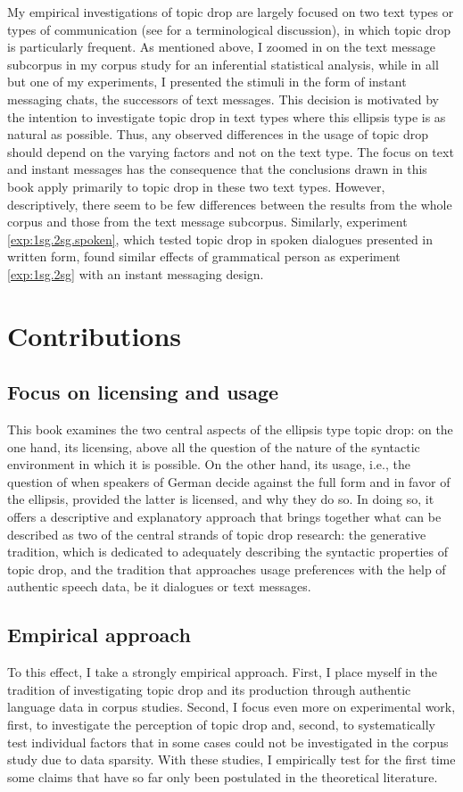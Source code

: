 My empirical investigations of topic drop are largely focused on two text types or types of communication (see  for a terminological discussion), in which topic drop is particularly frequent.
As mentioned above, I zoomed in on the text message subcorpus in my corpus study  for an inferential statistical analysis, while in all but one of my experiments, I presented the stimuli in the form of instant messaging chats, the successors of text messages.
This decision is motivated by the intention to investigate topic drop in text types where this ellipsis type is as natural as possible.
Thus, any observed differences in the usage of topic drop should depend on the varying factors and not on the text type.
The focus on text and instant messages has the consequence that the conclusions drawn in this book apply primarily to topic drop in these two text types. 
However, descriptively, there seem to be few differences between the results from the whole corpus and those from the text message subcorpus.
Similarly, experiment \ref*{exp:1sg.2sg.spoken}, which tested topic drop in spoken dialogues presented in written form, found similar effects of grammatical person as experiment \ref*{exp:1sg.2sg} with an instant messaging design.

\section{Contributions}
\subsection{Focus on licensing and usage}
This book examines the two central aspects of the ellipsis type topic drop:
on the one hand, its licensing, above all the question of the nature of the syntactic environment in which it is possible.
On the other hand, its usage, i.e., the question of when speakers of German decide against the full form and in favor of the ellipsis, provided the latter is licensed, and why they do so.
In doing so, it offers a descriptive and explanatory approach that brings together what can be described as two of the central strands of topic drop research:
the generative tradition, which is dedicated to adequately describing the syntactic properties of topic drop, and the tradition that approaches usage preferences with the help of authentic speech data, be it dialogues or text messages.

\subsection{Empirical approach}
To this effect, I take a strongly empirical approach.
First, I place myself in the tradition of investigating topic drop and its production  through authentic language data in corpus studies. 
Second, I focus even more on experimental work, first, to investigate the perception of topic drop and, second, to systematically test individual factors that in some cases could not be investigated in the corpus study due to data sparsity.
With these studies, I empirically test for the first time some claims that have so far only been postulated in the theoretical literature.

